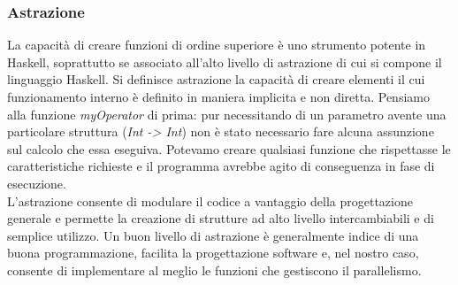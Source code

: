 \subsubsection{Astrazione}
La capacità di creare funzioni di ordine superiore è uno strumento potente in Haskell, soprattutto se associato all'alto livello di astrazione di cui si compone il linguaggio Haskell. Si definisce astrazione la capacità di creare elementi il cui funzionamento interno è definito in maniera implicita e non diretta. Pensiamo alla funzione \textit{myOperator} di prima: pur necessitando di un parametro avente una particolare struttura (\textit{Int -> Int}) non è stato necessario fare alcuna assunzione sul calcolo che essa eseguiva. Potevamo creare qualsiasi funzione che rispettasse le caratteristiche richieste e il programma avrebbe agito di conseguenza in fase di esecuzione.\\
L'astrazione consente di modulare il codice a vantaggio della progettazione generale e permette la creazione di strutture ad alto livello intercambiabili e di semplice utilizzo. Un buon livello di astrazione è generalmente indice di una buona programmazione, facilita la progettazione software e, nel nostro caso, consente di implementare al meglio le funzioni che gestiscono il parallelismo.
